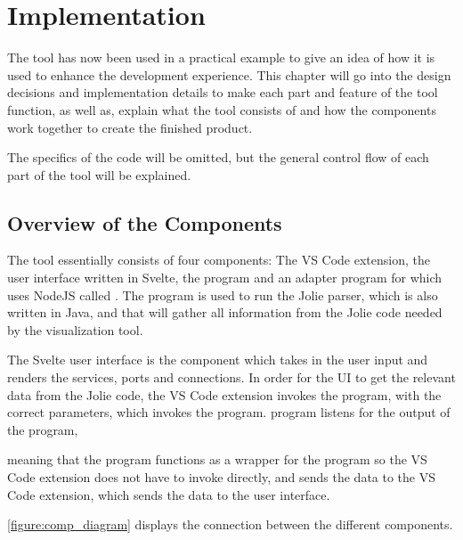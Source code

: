 \chapter{Implementation}
The tool has now been used in a practical example to give an idea of how it is used to enhance the development experience.
This chapter will go into the design decisions and implementation details to make each part and feature of the tool function, as well as,
explain what the tool consists of and how the components work together to create the finished product.

The specifics of the code will be omitted, but the general control flow of each part of the tool will be explained.

\section{Overview of the Components}
The tool essentially consists of four components: The VS Code extension, the user interface written in Svelte, the \javatoolname[] program and an adapter program for \javatoolname[] which uses NodeJS called \nodetoolname[].
The \javatoolname[] program is used to run the Jolie parser, which is also written in Java, and that will gather all information from the Jolie code needed by the visualization tool.

The Svelte user interface is the component which takes in the user input and renders the services, ports and connections.
In order for the UI to get the relevant data from the Jolie code, the VS Code extension invokes the \nodetoolname[] program, with the correct parameters, which invokes the \javatoolname[] program.
\nodetoolname[] program listens for the output of the \javatoolname[] program,

meaning that the \nodetoolname[] program functions as a wrapper for the \javatoolname[] program so the VS Code extension does not have to invoke \javatoolname[] directly,
and sends the data to the VS Code extension, which sends the data to the user interface.

\cref{figure:comp_diagram} displays the connection between the different components.

